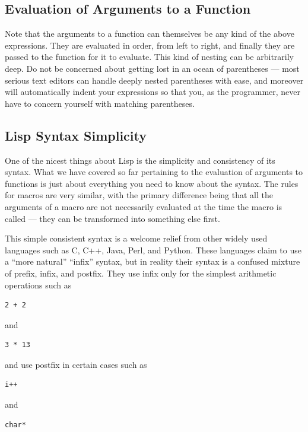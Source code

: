 \subsection{Evaluation of Arguments to a Function}

Note that the arguments to a function can themselves be any kind of the above expressions.
They are evaluated in order, from left to right, and finally they are passed to the function
for it to evaluate. This kind of nesting can be arbitrarily deep. Do not be concerned about
getting lost in an ocean of parentheses --- most serious text editors can handle deeply nested
parentheses with ease, and moreover will automatically indent your expressions so that you,
as the programmer, never have to concern yourself with matching parentheses.

\subsection{Lisp Syntax Simplicity}

One of the nicest things about Lisp is the simplicity and consistency of its syntax. What
we have covered so far pertaining to the evaluation of arguments to functions is just about
everything you need to know about the syntax. The rules for macros are very similar, with
the primary difference being that all the arguments of a macro are not necessarily evaluated
at the time the macro is called --- they can be transformed into something else first.

This simple consistent syntax is a welcome relief from other widely used languages such
as C, C++, Java, Perl, and Python. These languages claim to use a ``more natural'' ``infix''
syntax, but in reality their syntax is a confused mixture of prefix, infix, and postfix. They
use infix only for the simplest arithmetic operations such as

\begin{verbatim}
2 + 2
\end{verbatim}

and

\begin{verbatim}
3 * 13
\end{verbatim}

and use postfix in certain cases such as

\begin{verbatim}
i++
\end{verbatim}

and

\begin{verbatim}
char*
\end{verbatim}

